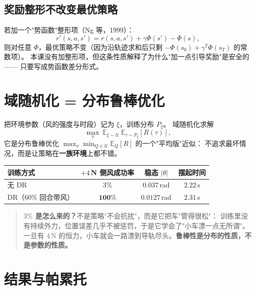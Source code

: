 \subsection{奖励整形不改变最优策略}

若加一个"势函数"整形项（Ng 等，1999）：
\begin{equation}
  r'(s,a,s')=r(s,a,s')+\gamma\Phi(s')-\Phi(s),
\end{equation}
则对任意 $\Phi$，最优策略不变（因为沿轨迹求和后只剩 $-\Phi(s_0)+\gamma^T\Phi(s_T)$ 的常数项）。
本课没有加整形项，但这条性质解释了为什么"加一点引导奖励"是安全的——
只要写成势函数差分形式。

\section{域随机化 = 分布鲁棒优化}

把环境参数（风的强度与时段）记为 $\xi$，训练分布 $P_\xi$。
域随机化求解
\begin{equation}
  \max_\pi\ \mathbb{E}_{\xi\sim\mathcal{U}}\ \mathbb{E}_{\tau\sim P_\xi}[R(\tau)],
\end{equation}
它是分布鲁棒优化 $\max_\pi\min_{Q\in\mathcal{U}} \mathbb{E}_{Q}[R]$ 的一个"平均版"近似：
不追求最坏情况，而是让策略在\textbf{一族环境}上都不错。

\begin{center}
\small
\begin{tabular}{@{}lccc@{}}
\toprule
训练方式 & $+4$\,N 侧风成功率 & 稳态 $|\theta|$ & 摆起时间 \\
\midrule
无 DR & $3\%$ & $0.037$\,rad & $2.22$\,s \\
DR（$60\%$ 回合带风） & $\mathbf{100\%}$ & $0.0127$\,rad & $2.31$\,s \\
\bottomrule
\end{tabular}
\end{center}

\begin{quote}
\textbf{$3\%$ 是怎么来的？}不是策略"不会抗扰"，而是它把车"管得很松"：
训练里没有持续外力，位置误差几乎不被惩罚，于是它学会了"小车漂一点无所谓"。
一旦有 $4$\,N 的恒力，小车就会一路漂到导轨尽头。\textbf{鲁棒性是分布的性质，不是参数的性质。}
\end{quote}

\section{结果与帕累托}

